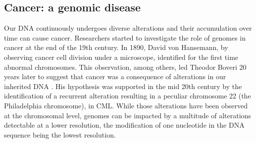 \subsection{Cancer: a genomic disease}

Our \gls*{DNA} continuously undergoes diverse alterations %
and their accumulation over time can cause cancer. Researchers started to investigate the role of genomes in cancer at the end of the 19th century. In 1890, David von Hansemann, by observing cancer cell division under a microscope, identified for the first time abnormal chromosomes. This observation, among others, led Theodor Boveri 20 years later to suggest that cancer was a consequence of alterations in our inherited \gls*{DNA} \cite{Stratton2009}. His hypothesis was supported in the mid 20th century by the identification of a recurrent alteration resulting in a peculiar chromosome 22 (the Philadelphia chromosome), in \gls{CML}.
While those alterations have been observed at the chromosomal level, genomes can be impacted by a multitude of alterations detectable at a lower resolution, the modification of one nucleotide in the \gls*{DNA} sequence being the lowest resolution. 

